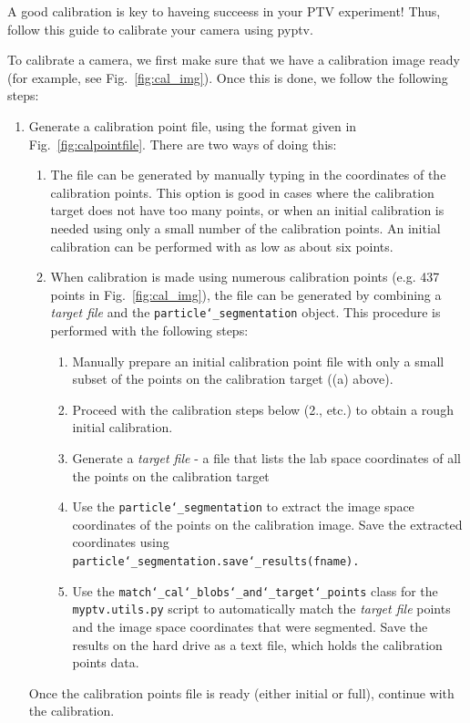 \documentclass[10pt,a4paper]{article}
\begin{document}
A good calibration is key to haveing succeess in your PTV experiment! Thus, follow this guide to calibrate your camera using pyptv.

To calibrate a camera, we first make sure that we have a calibration image ready (for example, see Fig.~\ref{fig:cal_img}). Once this is done, we follow the following steps:

\begin{enumerate}
	\item Generate a calibration point file, using the format given in Fig.~\ref{fig:calpointfile}. There are two ways of doing this: 
	\begin{enumerate}
		\item The file can be generated by manually typing in the coordinates of the calibration points. This option is good in cases where the calibration target does not have too many points, or when an initial calibration is needed using only a small number of the calibration points. An initial calibration can be performed with as low as about six points.
		
		\item When calibration is made using numerous calibration points (e.g. 437 points in Fig.~\ref{fig:cal_img}), the file can be generated by combining a \textit{target file} and the \texttt{particle\char`_segmentation} object. This procedure is performed with the following steps:
		
		\begin{enumerate}
		\item Manually prepare an initial calibration point file with only a small subset of the points on the calibration target ((a) above).
		\item Proceed with the calibration steps below (2., etc.) to obtain a rough initial calibration.
		\item Generate a \textit{target file} - a file that lists the lab space coordinates of all the points on the calibration target
		\item Use the \texttt{particle\char`_segmentation} to extract the image space coordinates of the points on the calibration image. Save the extracted coordinates using\\ \texttt{particle\char`_segmentation.save\char`_results(fname).}
		\item Use the \texttt{match\char`_cal\char`_blobs\char`_and\char`_target\char`_points} class for the \texttt{myptv.utils.py} script to automatically match the \textit{target file} points and the image space coordinates that were segmented. Save the results on the hard drive as a text file, which holds the calibration points data.
		\end{enumerate}
	\end{enumerate}
	Once the calibration points file is ready (either initial or full), continue with the calibration.
	

\end{enumerate}
\end{document}
